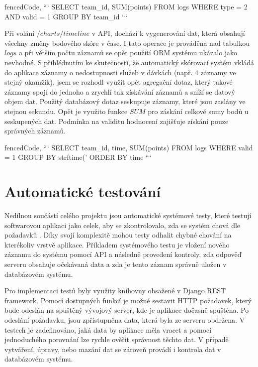\documentclass[
  digital, %
  twoside, %
  table,   %
  lof,     %
  lot,     %
]{fithesis3}
\begin{document}
\begin{markdown*}{%
  fencedCode,
}
```
SELECT team_id, SUM(points) FROM logs 
WHERE type = 2 AND valid = 1 
GROUP BY team_id
```
\end{markdown*}

Při volání $/charts/timeline$ v API, dochází k vygenerování dat, která obsahují všechny změny bodového skóre v čase. I tato operace je prováděna nad tabulkou $logs$ a při větším počtu záznamů se opět použití ORM systému ukázalo jako nevhodné. S přihlédnutím ke skutečnosti, že automatický skórovací systém vkládá do aplikace záznamy o nedostupnosti služeb v dávkách (např. 4 záznamy ve stejný okamžik), jsem se rozhodl využít opět agregační dotaz, který takové záznamy spojí do jednoho a zrychlí tak získávání záznamů a sníží se datový objem dat. Použitý databázový dotaz seskupuje záznamy, které jsou zaslány ve stejnou sekundu. Opět je využito funkce $SUM$ pro záskání celkové sumy bodů u seskupených dat. Podmínka na validitu hodnocení zajišťuje získání pouze správných záznamů.

\begin{markdown*}{%
  fencedCode,
}
```
SELECT team_id, time, SUM(points) FROM logs 
WHERE valid = 1 
GROUP BY strftime('%
ORDER BY time
```
\end{markdown*}

\section{Automatické testování}

Nedílnou součástí celého projektu jsou automatické systémové testy, které testují softwarovou aplikaci jako celek, aby se zkontrolovalo, zda se systém chová dle požadavků \cite{difSysTest}. Díky svojí komplexitě mohou testy odhalit chybné chování na kterékoliv vrstvě aplikace. Příkladem systémového testu je vložení nového záznamu do systému pomocí API a následně provedení kontroly, zda odpověď serveru obsahuje očekávaná data a zda je tento záznam správně uložen v databázovém systému.

Pro implementaci testů byly využity knihovny obsažené v Django REST framework. Pomocí dostupných funkcí je možné sestavit HTTP požadavek, který bude odeslán na spuštěný vývojový server, kde je aplikace dočasně spuštěna. Po odeslání požadavku, jsou zpřístupněna data, která byla ze serveru obdržena. V testech je zadefinováno, jaká data by aplikace měla vracet a pomocí jednoduchého porovnání lze rychle ověřit správnost těchto dat. V případě vytváření, úpravy, nebo mazání dat se zároveň provádí i kontrola dat v databázovém systému. 
\end{document}
